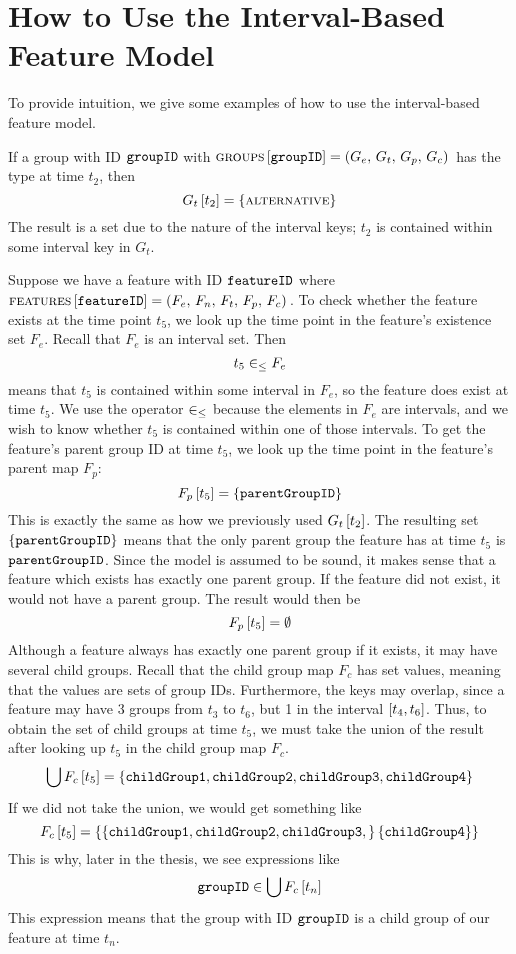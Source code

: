 \section{How to Use the Interval-Based Feature Model}
\label{sec:how-to-use-the-interval-based-feature-model}
To provide intuition, we give some examples of how to use the interval-based feature model.

If a group with ID $\texttt{groupID}$ with $\textsc{groups}{} \left[ \texttt{groupID} \right] = \left(G_e,\, G_t,\, G_p,\, G_c\right){}$ has the type \xortype{} at time $t_2$, then
\[
  G_t \left[ t_2 \right] = \left\{\textsc{alternative}{}\right\}
\]
The result is a set due to the nature of the interval keys; $t_2$ is contained within some interval key in $G_t$. 

Suppose we have a feature with ID $\texttt{featureID}$ where $\textsc{features} \left[ \texttt{featureID} \right] = \left(F_e,\, F_n,\, F_t,\, F_p,\, F_c\right){}$. To check whether the feature exists at the time point $t_5$, we look up the time point in the feature's existence set $F_e$. Recall that $F_e$ is an interval set. Then
\[
  t_5 \in_\leq F_e
\]
means that $t_5$ is contained within some interval in $F_e$, so the feature does exist at time $t_5$. We use the operator $\in_\leq$ because the elements in $F_e$ are intervals, and we wish to know whether $t_5$ is contained within one of those intervals. To get the feature's parent group ID at time $t_5$, we look up the time point in the feature's parent map $F_p$:
\[
  F_p \left[ t_5 \right] = \left\{\texttt{parentGroupID}\right\}
\]
This is exactly the same as how we previously used $G_t \left[ t_2 \right]$. The resulting set $\left\{\texttt{parentGroupID}\right\}$ means that the only parent group the feature has at time $t_5$ is $\texttt{parentGroupID}$. Since the model is assumed to be sound, it makes sense that a feature which exists has exactly one parent group. If the feature did not exist, it would not have a parent group. The result would then be
\[
  F_p \left[ t_5 \right] = \emptyset
\]
Although a feature always has exactly one parent group if it exists, it may have several child groups. Recall that the child group map $F_c$ has set values, meaning that the values are sets of group IDs. Furthermore, the keys may overlap, since a feature may have 3 groups from $t_3$ to $t_6$, but 1 in the interval $\interval{t_4}{t_6}$. Thus, to obtain the set of child groups at time $t_5$, we must take the union of the result after looking up $t_5$ in the child group map $F_c$.
\[
  \bigcup{F_c \left[ t_5 \right]} = \left\{\texttt{childGroup1}, \texttt{childGroup2}, \texttt{childGroup3}, \texttt{childGroup4}\right\}
\]
If we did not take the union, we would get something like
\[
  F_c \left[ t_5 \right] = \left\{\left\{\texttt{childGroup1}, \texttt{childGroup2}, \texttt{childGroup3},\right\} \left\{\texttt{childGroup4}\right\}\right\}
\]
This is why, later in the thesis, we see expressions like
\[
  \texttt{groupID} \in \bigcup{F_c \left[ t_n \right]}
\]
This expression means that the group with ID $\texttt{groupID}$ is a child group of our feature at time $t_n$.

